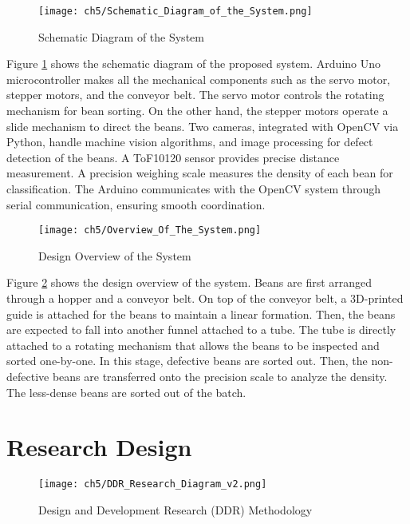 \begin{figure}[H]
    \centering
    \texttt{[image: ch5/Schematic\_Diagram\_of\_the\_System.png]}
    \caption{Schematic Diagram of the System}
    \label{fig:system_schematic_diagram}
\end{figure}

Figure \ref{fig:system_schematic_diagram} shows the schematic diagram of the proposed system. Arduino Uno microcontroller makes all the mechanical components such as the servo motor, stepper motors, and the conveyor belt. The servo motor controls the  rotating mechanism for bean sorting. On the other hand, the stepper motors operate a slide mechanism to direct the beans. Two cameras, integrated with OpenCV via Python, handle machine vision algorithms, and image processing for defect detection of the beans. A ToF10120 sensor provides precise distance measurement. A precision weighing scale measures the density of each bean for classification. The Arduino communicates with the OpenCV system through serial communication, ensuring smooth coordination.

\begin{figure}[H]
    \centering
    \texttt{[image: ch5/Overview\_Of\_The\_System.png]}
    \caption{Design Overview of the System}
    \label{fig:system_design_overview}
\end{figure}

Figure \ref{fig:system_design_overview} shows the design overview of the system. Beans are first arranged through a hopper and a conveyor belt. On top of the conveyor belt, a 3D-printed guide is attached for the beans to maintain a linear formation. Then, the beans are expected to fall into another funnel attached to a tube. The tube is directly attached to a rotating mechanism that allows the beans to be inspected and sorted one-by-one. In this stage, defective beans are sorted out. Then, the non-defective beans are transferred onto the precision scale to analyze the density. The less-dense beans are sorted out of the batch.

\section{Research Design}
\label{sec:research_design}

\begin{figure}[H]
    \centering
    \texttt{[image: ch5/DDR\_Research\_Diagram\_v2.png]}
    \caption{Design and Development Research (DDR) Methodology}
    \label{fig:ddr_methodology}
\end{figure}

